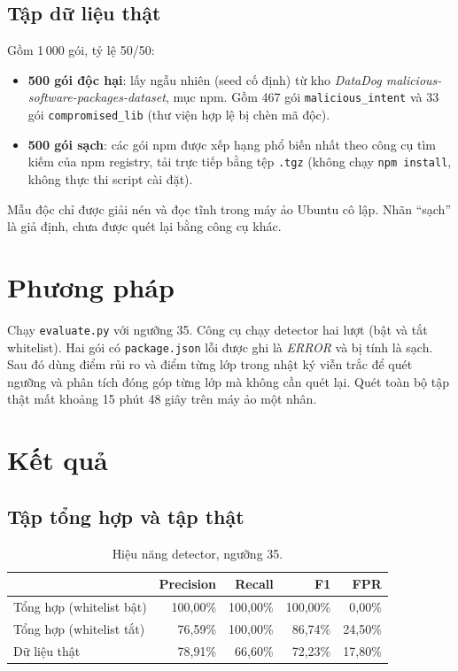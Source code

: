 \documentclass[12pt,a4paper]{article}
\begin{document}
\subsection{Tập dữ liệu thật}
Gồm 1\,000 gói, tỷ lệ 50/50:
\begin{itemize}
  \item \textbf{500 gói độc hại}: lấy ngẫu nhiên (seed cố định) từ kho \textit{DataDog malicious-software-packages-dataset}, mục npm. Gồm 467 gói \texttt{malicious\_intent} và 33 gói \texttt{compromised\_lib} (thư viện hợp lệ bị chèn mã độc).
  \item \textbf{500 gói sạch}: các gói npm được xếp hạng phổ biến nhất theo công cụ tìm kiếm của npm registry, tải trực tiếp bằng tệp \texttt{.tgz} (không chạy \texttt{npm install}, không thực thi script cài đặt).
\end{itemize}
Mẫu độc chỉ được giải nén và đọc tĩnh trong máy ảo Ubuntu cô lập. Nhãn ``sạch'' là giả định, chưa được quét lại bằng công cụ khác.

\section{Phương pháp}
Chạy \texttt{evaluate.py} với ngưỡng 35. Công cụ chạy detector hai lượt (bật và tắt whitelist). Hai gói có \texttt{package.json} lỗi được ghi là \textit{ERROR} và bị tính là sạch. Sau đó dùng điểm rủi ro và điểm từng lớp trong nhật ký viễn trắc để quét ngưỡng và phân tích đóng góp từng lớp mà không cần quét lại. Quét toàn bộ tập thật mất khoảng 15 phút 48 giây trên máy ảo một nhân.

\section{Kết quả}
\subsection{Tập tổng hợp và tập thật}
\begin{table}[H]
\centering
\begin{tabular}{lrrrr}
\toprule
 & Precision & Recall & F1 & FPR \\
\midrule
Tổng hợp (whitelist bật) & 100{,}00\% & 100{,}00\% & 100{,}00\% & 0{,}00\% \\
Tổng hợp (whitelist tắt) & 76{,}59\% & 100{,}00\% & 86{,}74\% & 24{,}50\% \\
Dữ liệu thật & 78{,}91\% & 66{,}60\% & 72{,}23\% & 17{,}80\% \\
\bottomrule
\end{tabular}
\caption{Hiệu năng detector, ngưỡng 35.}
\end{table}
\end{document}
